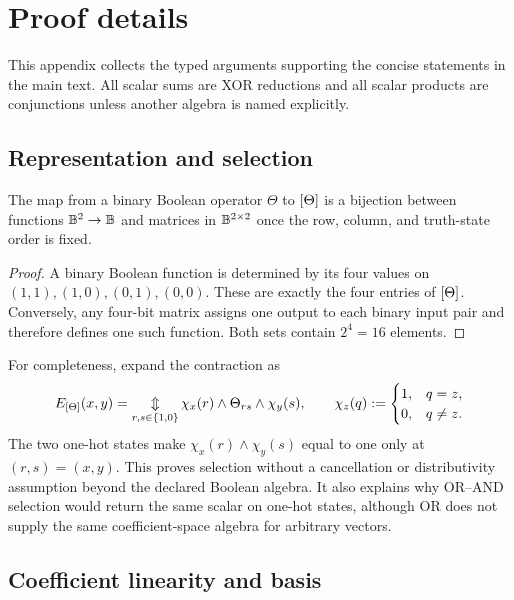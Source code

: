 \appendix

\section{Proof details}
\label{app:proofs}

This appendix collects the typed arguments supporting the concise statements
in the main text. All scalar sums are XOR reductions and all scalar products
are conjunctions unless another algebra is named explicitly.

\subsection{Representation and selection}

\begin{proposition}
The map from a binary Boolean operator $\Theta$ to $[\Theta]$ is a
bijection between functions $\mathbb{B}^2\rightarrow\mathbb{B}$ and matrices in
$\mathbb{B}^{2\times2}$ once the row, column, and truth-state order is fixed.
\end{proposition}

\begin{proof}
A binary Boolean function is determined by its four values on
$(1,1),(1,0),(0,1),(0,0)$. These are exactly the four entries of
$[\Theta]$. Conversely, any four-bit matrix assigns one output to each
binary input pair and therefore defines one such function. Both sets contain
$2^4=16$ elements.
\end{proof}

For completeness, expand the contraction as
\begin{equation}
  E_{[\Theta]}(x,y)
  =\mathop{\mathbin{\Updownarrow}}_{r,s\in\{1,0\}}
    \chi_x(r)\wedge\Theta_{rs}\wedge\chi_y(s),
  \qquad
  \chi_z(q):=\begin{cases}1,&q=z,\\0,&q\ne z.\end{cases}
\end{equation}
The two one-hot states make
$\chi_x(r)\wedge\chi_y(s)$ equal to one only at $(r,s)=(x,y)$.
This proves selection without a cancellation or distributivity assumption
beyond the declared Boolean algebra. It also explains why OR--AND selection
would return the same scalar on one-hot states, although OR does not supply the
same coefficient-space algebra for arbitrary vectors.

\subsection{Coefficient linearity and basis}

